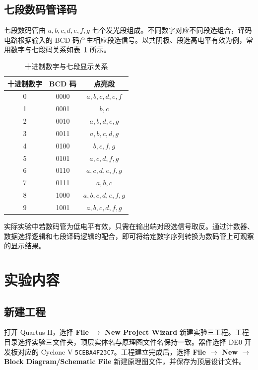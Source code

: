 \documentclass[12pt]{ctexart}
\begin{document}
\subsection{七段数码管译码}

七段数码管由 $a,b,c,d,e,f,g$ 七个发光段组成。不同数字对应不同段选组合，译码电路根据输入的 BCD 码产生相应段选信号。以共阴极、段选高电平有效为例，常用数字与七段码关系如表~\ref{tab:segment_code} 所示。

\begin{table}[H]
    \centering
    \caption{十进制数字与七段显示关系}
    \label{tab:segment_code}
    \begin{tabular}{c c c}
        \toprule
        \textbf{十进制数字} & \textbf{BCD 码} & \textbf{点亮段} \\
        \midrule
        0 & 0000 & $a,b,c,d,e,f$ \\
        1 & 0001 & $b,c$ \\
        2 & 0010 & $a,b,d,e,g$ \\
        3 & 0011 & $a,b,c,d,g$ \\
        4 & 0100 & $b,c,f,g$ \\
        5 & 0101 & $a,c,d,f,g$ \\
        6 & 0110 & $a,c,d,e,f,g$ \\
        7 & 0111 & $a,b,c$ \\
        8 & 1000 & $a,b,c,d,e,f,g$ \\
        9 & 1001 & $a,b,c,d,f,g$ \\
        \bottomrule
    \end{tabular}
\end{table}

实际实验中若数码管为低电平有效，只需在输出端对段选信号取反。通过计数器、数据选择逻辑和七段译码逻辑的配合，即可将给定数字序列转换为数码管上可观察的显示结果。

\section{实验内容}

\subsection{新建工程}

打开 Quartus II，选择 \textbf{File $\rightarrow$ New Project Wizard} 新建实验三工程。工程目录选择实验三文件夹，顶层实体名与原理图文件名保持一致。器件选择 DE0 开发板对应的 Cyclone V \texttt{5CEBA4F23C7}。工程建立完成后，选择 \textbf{File $\rightarrow$ New $\rightarrow$ Block Diagram/Schematic File} 新建原理图文件，并保存为顶层设计文件。
\end{document}
